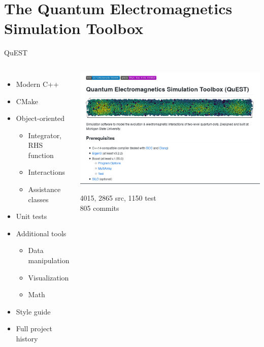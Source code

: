 \documentclass[aspectratio=169, usenames, dvipsnames]{beamer}
\begin{document}
\section{The \textcolor{BrickRed}{Qu}antum \textcolor{BrickRed}{E}lectromagnetics \textcolor{BrickRed}{S}imulation \textcolor{BrickRed}{T}oolbox}

\begin{frame}{QuEST}
  \begin{columns}
      \begin{itemize}
        \item[] Modern C++
        \item[] CMake
        \item[] Object-oriented
          \begin{itemize}
            \item Integrator, RHS function
            \item Interactions
            \item Assistance classes
          \end{itemize}
        \item[] Unit tests
        \item[] Additional tools
          \begin{itemize}
            \item Data manipulation
            \item Visualization
            \item Math
          \end{itemize}
        \item[] Style guide
        \item[] Full project history
      \end{itemize}

      \begin{center}
        \vspace{-0.5cm}
        \href{https://www.github.com/cglosser/quest}{
          \includegraphics[width=\textwidth]{figures/github_cropped.png}
        }

        {\footnotesize \SI{4015}{\sloc}, 2865 src, 1150 test \\ 805 commits }
      \end{center}
  \end{columns}
\end{frame}
\end{document}
